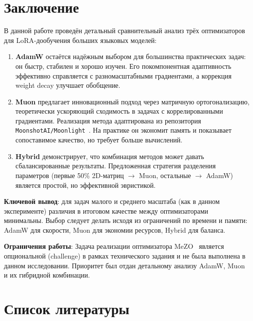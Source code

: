 \documentclass[a4paper,12pt]{article}
\begin{document}
\section{Заключение}
\label{sec:conclusion}

В данной работе проведён детальный сравнительный анализ трёх оптимизаторов для LoRA-дообучения больших языковых моделей:

\begin{enumerate}
    \item \textbf{AdamW} остаётся надёжным выбором для большинства практических задач: он быстр, стабилен и хорошо изучен. Его покомпонентная адаптивность эффективно справляется с разномасштабными градиентами, а коррекция weight decay улучшает обобщение.
    
    \item \textbf{Muon} предлагает инновационный подход через матричную ортогонализацию, теоретически ускоряющий сходимость в задачах с коррелированными градиентами. Реализация метода адаптирована из репозитория \texttt{MoonshotAI/Moonlight}~\cite{moonshot2024muon}. На практике он экономит память и показывает сопоставимое качество, но требует больше вычислений.
    
    \item \textbf{Hybrid} демонстрирует, что комбинация методов может давать сбалансированные результаты. Предложенная стратегия разделения параметров (первые 50\% 2D-матриц $\rightarrow$ Muon, остальные $\rightarrow$ AdamW) является простой, но эффективной эвристикой.
\end{enumerate}

\textbf{Ключевой вывод}: для задач малого и среднего масштаба (как в данном эксперименте) различия в итоговом качестве между оптимизаторами минимальны. Выбор следует делать исходя из ограничений по времени и памяти: AdamW для скорости, Muon для экономии ресурсов, Hybrid для баланса.

\textbf{Ограничения работы}: Задача реализации оптимизатора MeZO~\cite{mezo2023} является опциональной (challenge) в рамках технического задания и не была выполнена в данном исследовании. Приоритет был отдан детальному анализу AdamW, Muon и их гибридной комбинации.

\section*{Список литературы}
\label{sec:references}
\end{document}
